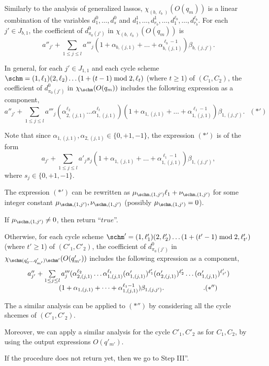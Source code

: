 Similarly to the analysis of generalized lassos, $\chi_{(b,\ell_b)}(O(q_m))$ is a linear combination of the variables $d^0_1,\dots, d^0_s$ and $d^1_1,\dots, d^1_{r_b}, \dots, d^{\ell_b}_1,\dots, d^{\ell_b}_{r_b}$. For each $j' \in J_{b,1}$, the coefficient of $d^0_{\pi_0(j')}$ in $\chi_{(b,\ell_b)}(O(q_m))$ is 
%
\[a''_{j'} + \sum \limits_{1 \le j \le l} a'''_j (1+\alpha_{b,(j,1)} + \dots +\alpha^{\ell_b-1}_{b,(j,1)})\beta_{b,(j,j')}.\]
%

In general, for each $j' \in J_{1,1}$ and each cycle scheme $\schm=(1,\ell_1)(2,\ell_2) \dots (1+(t-1) \bmod 2,\ell_{t})$ (where $t \ge 1$) of $(C_1,C_2)$, the coefficient of $d^0_{\pi_0(j')}$ in $\chi_{\schm}(O(q_m))$ includes the following expression as a component,
%
\[a''_{j'} + \sum \limits_{1 \le j \le l} a'''_j (\alpha^{\ell_2}_{2,(j,1)} \dots \alpha^{\ell_t}_{1,(j,1)}) (1+\alpha_{1,(j,1)} + \dots +\alpha^{\ell_1-1}_{1,(j,1)})\beta_{1,(j,j')}. \ \ \  (\ast')\]

Note that since $\alpha_{1,(j,1)},\alpha_{2,(j,1)} \in \{0,+1,-1\}$, the expression $(\ast')$ is of the form 
\[a_{j'} + \sum \limits_{1 \le j \le l} a'_j  s_j (1+\alpha_{1,(j,1)} + \dots +\alpha^{\ell_1-1}_{1,(j,1)})\beta_{1,(j,j')},\]
where $s_j \in \{0,+1,-1\}$.

The expression $(\ast')$ can be rewritten as $\mu_{\schm,(1,j')} \ell_1 + \nu_{\schm,(1,j')}$ for some integer constant $\mu_{\schm,(1,j')},\nu_{\schm,(1,j')}$ (possibly $\mu_{\schm,(1,j')}=0$). 

If $\mu_{\schm,(1,j')} \neq 0$, then return ``$true$''. 

Otherwise, for each cycle scheme $\schm'=(1,\ell'_1)(2,\ell'_2) \dots (1+(t'-1) \bmod 2,\ell'_{t'})$ (where $t' \ge 1$) of $(C'_1,C'_2)$, the coefficient of $d^0_{\pi_0(j')}$ in $\chi_{\schm (q'_0 \dots q'_{m'})\schm'}(O(q'_{m'}))$ includes the following expression as a component,
\[
\begin{array}{l c l}
a''_{j'} + \sum \limits_{1 \le j \le l} a'''_j (\alpha^{\ell_2}_{2,(j,1)} \dots \alpha^{\ell_t}_{1,(j,1)} (\alpha'_{1,(j,1)})^{\ell'_{1}} (\alpha'_{2,(j,1)})^{\ell'_{2}} \dots (\alpha'_{1,(j,1)})^{\ell'_{t'}}) \\
\hspace{16mm} (1+\alpha_{1,(j,1)} + \dots +\alpha^{\ell_1-1}_{1,(j,1)})\beta_{1,(j,j')}. \hspace{2cm}. (\ast'')
\end{array}
\]

The a similar analysis can be applied to $(\ast'')$ by considering all the cycle shcemes of $(C'_1,C'_2)$.

Moreover, we can apply a similar analysis for the cycle $C'_1,C'_2$ as for $C_1,C_2$, by using the output expressions $O(q'_{m'})$.

If the procedure does not return yet, then we go to Step III''.
